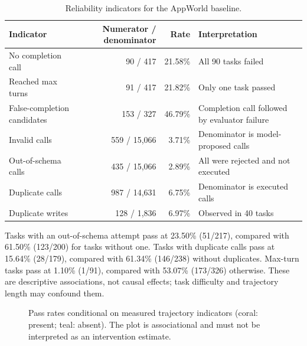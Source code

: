 \documentclass[10pt]{article}
\begin{document}
\begin{table}[t]
\centering
\caption{Reliability indicators for the AppWorld baseline.}
\label{tab:reliability}
\small
\begin{tabularx}{\linewidth}{@{}YrrY@{}}
\toprule
Indicator & Numerator / denominator & Rate & Interpretation \\
\midrule
No completion call & 90 / 417 & 21.58\% & All 90 tasks failed \\
Reached max turns & 91 / 417 & 21.82\% & Only one task passed \\
False-completion candidates & 153 / 327 & 46.79\% & Completion call followed by evaluator failure \\
Invalid calls & 559 / 15,066 & 3.71\% & Denominator is model-proposed calls \\
Out-of-schema calls & 435 / 15,066 & 2.89\% & All were rejected and not executed \\
Duplicate calls & 987 / 14,631 & 6.75\% & Denominator is executed calls \\
Duplicate writes & 128 / 1,836 & 6.97\% & Observed in 40 tasks \\
\bottomrule
\end{tabularx}
\end{table}

Tasks with an out-of-schema attempt pass at 23.50\% (51/217), compared with
61.50\% (123/200) for tasks without one. Tasks with duplicate calls pass at
15.64\% (28/179), compared with 61.34\% (146/238) without duplicates. Max-turn
tasks pass at 1.10\% (1/91), compared with 53.07\% (173/326) otherwise. These are
descriptive associations, not causal effects; task difficulty and trajectory
length may confound them.

\begin{figure}[t]
\centering
{}
\caption{Pass rates conditional on measured trajectory indicators (coral:
present; teal: absent). The plot is associational and must not be interpreted as
an intervention estimate.}
\label{fig:associations}
\end{figure}
\end{document}
